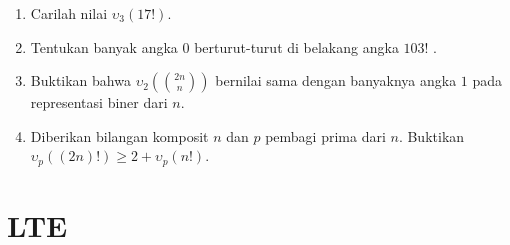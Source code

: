 \documentclass[12pt]{scrartcl}
\begin{document}
\begin{enumerate}
    \item Carilah nilai $\upsilon_3(17!)$.
    
    \item Tentukan banyak angka 0 berturut-turut di belakang angka $103!$ .
    
    \item Buktikan bahwa $\upsilon_2(\binom{2n}{n})$ bernilai sama dengan banyaknya angka $1$ pada representasi biner dari $n$.
    
    \item Diberikan bilangan komposit $n$ dan $p$ pembagi prima dari $n$. Buktikan $\upsilon_p((2n)!) \geq 2+\upsilon_p(n!)$.
\end{enumerate}

\section{LTE}
\end{document}
